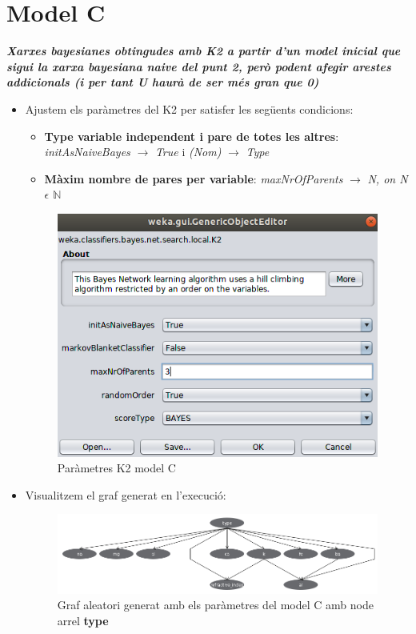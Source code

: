 \documentclass[11pt,a4paper]{article}
\begin{document}
\newpage

\section{Model C}
\textbf{\textit{Xarxes bayesianes obtingudes amb K2 a partir d'un model inicial que sigui la xarxa bayesiana naive del punt 2, però podent afegir arestes addicionals (i per tant U haurà de ser més gran que 0)}}
\begin{itemize}
\item Ajustem els paràmetres del K2 per satisfer les següents condicions:
	\begin{itemize}
	\item \textbf{Type variable independent i pare de totes les altres}: \textit{initAsNaiveBayes} $\rightarrow$ \textit{True} i \textit{(Nom)} $\rightarrow$ \textit{Type}
	\item \textbf{Màxim nombre de pares per variable}:  
 \textit{maxNrOfParents} $\rightarrow$ \textit{N, on N $\epsilon$  $\mathbb{N}$ }\\
	\end{itemize}
	\begin{figure}[hbtp]
	\centering
	\includegraphics[scale=0.4]{Figures/4.png}
	\caption{Paràmetres K2 model C}
	\end{figure}
\item Visualitzem el graf generat en l'execució:\\
	\begin{figure}[hbtp]
	\centering
	\includegraphics[scale=0.4]{Figures/r3.png}
	\caption{Graf aleatori generat amb els paràmetres del model C amb node arrel \textbf{type}}
	\end{figure}
\end{itemize}
\end{document}
